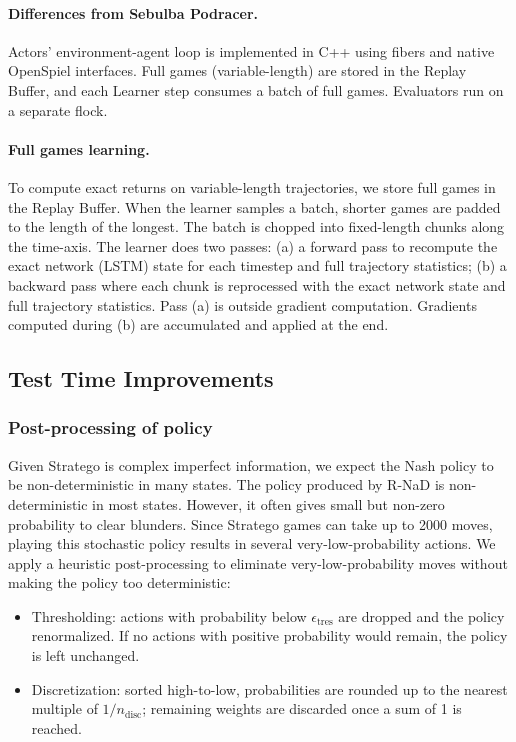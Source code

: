 \paragraph{Differences from Sebulba Podracer.} Actors' environment-agent loop is implemented in C++ using fibers and native OpenSpiel interfaces. Full games (variable-length) are stored in the Replay Buffer, and each Learner step consumes a batch of full games. Evaluators run on a separate flock.

\paragraph{Full games learning.}
To compute exact returns on variable-length trajectories, we store full games in the Replay Buffer. When the learner samples a batch, shorter games are padded to the length of the longest. The batch is chopped into fixed-length chunks along the time-axis. The learner does two passes: (a) a forward pass to recompute the exact network (LSTM) state for each timestep and full trajectory statistics; (b) a backward pass where each chunk is reprocessed with the exact network state and full trajectory statistics. Pass (a) is outside gradient computation. Gradients computed during (b) are accumulated and applied at the end.

\subsection{Test Time Improvements}

\subsubsection{Post-processing of policy}
Given Stratego is complex imperfect information, we expect the Nash policy to be non-deterministic in many states. The policy produced by R-NaD is non-deterministic in most states. However, it often gives small but non-zero probability to clear blunders. Since Stratego games can take up to 2000 moves, playing this stochastic policy results in several very-low-probability actions. We apply a heuristic post-processing to eliminate very-low-probability moves without making the policy too deterministic:
\begin{itemize}
\item Thresholding: actions with probability below $\epsilon_\text{tres}$ are dropped and the policy renormalized. If no actions with positive probability would remain, the policy is left unchanged.
\item Discretization: sorted high-to-low, probabilities are rounded up to the nearest multiple of $1/n_\text{disc}$; remaining weights are discarded once a sum of 1 is reached.
\end{itemize}


